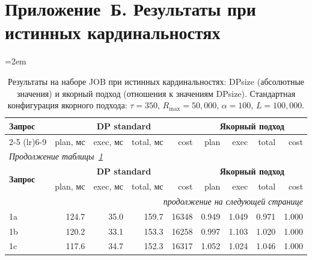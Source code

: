 
\clearpage
\section*{Приложение~Б. Результаты при истинных кардинальностях}
\sloppy
\emergencystretch=2em

\begin{center}
\footnotesize
\setlength{\tabcolsep}{4pt}
\renewcommand{\arraystretch}{1.1}
\begin{longtable}{@{}l@{\hspace{6pt}}rrrr@{\hspace{8pt}}rrrr@{}}
\caption{Результаты на наборе JOB при истинных кардинальностях: DPsize (абсолютные значения) и якорный подход (отношения к значениям DPsize). Стандартная конфигурация якорного подхода: $\tau{=}350$, $R_{\max}{=}50{,}000$, $\alpha{=}100$, $L{=}100{,}000$.}\label{tab:appB-job} \\
\toprule
\multirow{2}{*}{\textbf{Запрос}} & \multicolumn{4}{c}{\textbf{DP standard}} & \multicolumn{4}{c}{\textbf{Якорный подход}} \\
\cmidrule(lr){2-5} \cmidrule(lr){6-9}
 & plan, мс & exec, мс & total, мс & cost & plan & exec & total & cost \\
\midrule
\endfirsthead
\multicolumn{9}{l}{\textit{Продолжение таблицы~\ref{tab:appB-job}}} \\
\toprule
\multirow{2}{*}{\textbf{Запрос}} & \multicolumn{4}{c}{\textbf{DP standard}} & \multicolumn{4}{c}{\textbf{Якорный подход}} \\
\cmidrule(lr){2-5} \cmidrule(lr){6-9}
 & plan, мс & exec, мс & total, мс & cost & plan & exec & total & cost \\
\midrule
\endhead
\midrule
\multicolumn{9}{r}{\textit{продолжение на следующей странице}} \\
\endfoot
\bottomrule
\endlastfoot
1a & 124.7 & 35.0 & 159.7 & 16348 & 0.949 & 1.049 & 0.971 & 1.000 \\
1b & 120.2 & 33.1 & 153.3 & 16258 & 0.997 & 1.103 & 1.020 & 1.000 \\
1c & 117.6 & 34.7 & 152.3 & 16317 & 1.052 & 1.024 & 1.046 & 1.000 \\

\end{longtable}
\end{center}
